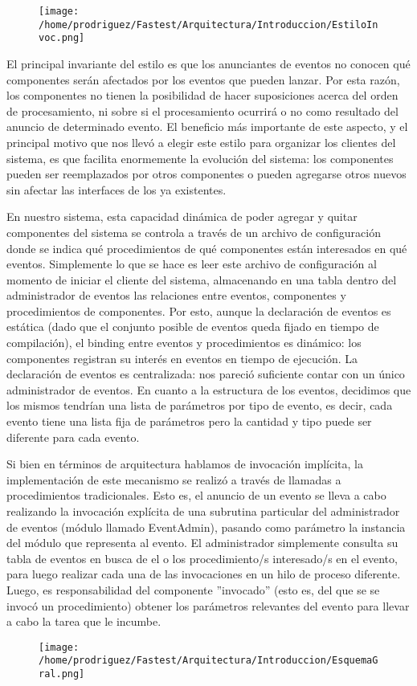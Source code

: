 \documentclass[a4paper,11pt]{article}
\begin{document}
\begin{figure}
\begin{center}
\texttt{[image: /home/prodriguez/Fastest/Arquitectura/Introduccion/EstiloInvoc.png]}
\end{center}
\end{figure}



El principal invariante del estilo es que los anunciantes de eventos no conocen qué componentes serán afectados por los eventos que pueden lanzar. Por esta razón, los componentes no tienen la posibilidad de hacer suposiciones acerca del orden de procesamiento, ni sobre si el procesamiento ocurrirá o no como resultado del anuncio de determinado evento. El beneficio más importante de este aspecto, y el principal motivo que nos llevó a elegir este estilo para organizar los clientes del sistema, es que facilita enormemente la evolución del sistema: los componentes pueden ser reemplazados por otros componentes o pueden agregarse otros nuevos sin afectar las interfaces de los ya existentes.

En nuestro sistema, esta capacidad dinámica de poder agregar y quitar componentes del sistema se controla a través de un archivo de configuración donde se indica qué procedimientos de qué componentes están interesados en qué eventos. Simplemente lo que se hace es leer este archivo de configuración al momento de iniciar el cliente del sistema, almacenando en una tabla dentro del administrador de eventos las relaciones entre eventos, componentes y procedimientos de componentes. Por esto, aunque la declaración de eventos es estática (dado que el conjunto posible de eventos queda fijado en tiempo de compilación), el binding entre eventos y procedimientos es dinámico: los componentes registran su interés en eventos en tiempo de ejecución. La declaración de eventos es centralizada: nos pareció suficiente contar con un único administrador de eventos. En cuanto a la estructura de los eventos, decidimos que los mismos tendrían una lista de parámetros por tipo de evento, es decir, cada evento tiene una lista fija de parámetros pero la cantidad y tipo puede ser diferente para cada evento.

Si bien en términos de arquitectura hablamos de invocación implícita, la implementación de este mecanismo se realizó a través de llamadas a procedimientos tradicionales. Esto es, el anuncio de un evento se lleva a cabo realizando la invocación explícita de una subrutina particular del administrador de eventos (módulo llamado EventAdmin), pasando como parámetro la instancia del módulo que representa al evento. El administrador simplemente consulta su tabla de eventos en busca de el o los procedimiento/s interesado/s en el evento, para luego realizar cada una de las invocaciones en un hilo de proceso diferente. Luego, es responsabilidad del componente ''invocado'' (esto es, del que se se invocó un procedimiento) obtener los parámetros relevantes del evento para llevar a cabo la tarea que le incumbe.

\begin{figure}
\begin{center}
\texttt{[image: /home/prodriguez/Fastest/Arquitectura/Introduccion/EsquemaGral.png]}
\end{center}
\end{figure}
\end{document}
